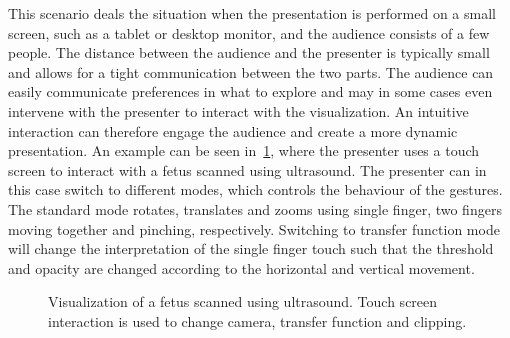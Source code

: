 \documentclass[review,journal]{vgtc}         %
\begin{document}
This scenario deals the situation when the presentation is performed on a small screen, such as a tablet or desktop monitor, and the audience consists of a few people. 
The distance between the audience and the presenter is typically small and allows for a tight communication between the two parts. 
The audience can easily communicate preferences in what to explore and may in some cases even intervene with the presenter to interact with the visualization. 
An intuitive interaction can therefore engage the audience and create a more dynamic presentation.
An example can be seen in~\cref{img:touch_workstation}, where the presenter uses a touch screen to interact with a fetus scanned using ultrasound.
The presenter can in this case switch to different modes, which controls the behaviour of the gestures. 
The standard mode rotates, translates and zooms using single finger, two fingers moving together and pinching, respectively. 
Switching to transfer function mode will change the interpretation of the single finger touch such that the threshold and opacity are changed according to the horizontal and vertical movement.

%
%
%
%

\begin{figure}[htb]
	\centering
	\caption{Visualization of a fetus scanned using ultrasound. Touch screen interaction is used to change camera, transfer function and clipping.}
	\label{img:touch_workstation}
\end{figure}
\end{document}
